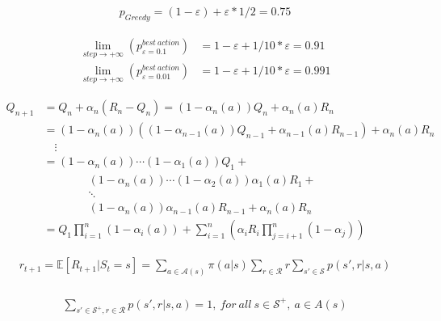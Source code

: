 \documentclass{article}
\begin{document}
\[
  \begin{aligned}
    p_{Greedy} = (1 - \varepsilon) + \varepsilon * 1/2 = 0.75
  \end{aligned}
\]

\[
  \begin{aligned}
    \lim\limits_{step\to+\infty} (p_{\varepsilon=0.1}^{best \ action}) &= 1 - \varepsilon + 1/10 * \varepsilon = 0.91 \\
    \lim\limits_{step\to+\infty} (p_{\varepsilon=0.01}^{best \ action}) &= 1 - \varepsilon + 1/10 * \varepsilon = 0.991
  \end{aligned}
\]

\[
  \begin{aligned}
    Q_{n+1} &= Q_{n} + \alpha_n (R_n - Q_n) = (1 - \alpha_n(a))Q_n + \alpha_n(a)R_n \\
            &= (1 - \alpha_n(a))((1 - \alpha_{n-1}(a))Q_{n-1} + \alpha_{n-1}(a)R_{n-1}) + \alpha_n(a)R_n\\
            & \quad \vdots\\
            &= (1 - \alpha_n(a))\cdots(1-\alpha_1(a))Q_1 + \\
            & \qquad \qquad (1 - \alpha_n(a))\cdots(1-\alpha_2(a))\alpha_1(a)R_1 + \\
            & \qquad \qquad \ddots\\
            & \qquad \qquad (1 - \alpha_n(a))\alpha_{n-1}(a)R_{n-1} + \alpha_n(a)R_n \\
            &= Q_1\prod^n_{i=1}(1 - \alpha_i(a)) + \sum^n_{i=1} (\alpha_iR_i \prod^n_{j=i+1}(1-\alpha_j))
  \end{aligned}
\]

\[
  \begin{aligned}
  r_{t+1} = \mathbb{E}[R_{t+1} | S_t = s] = \sum_{a\in \mathcal{A}(s)}\pi(a|s) \sum_{r\in\mathcal{R}} r \sum_{s'\in\mathcal{S}}p(s',r|s,a)\\
  \end{aligned}
\]

\[
  \begin{aligned}
  \sum_{s' \in \mathcal{S^+},r \in \mathcal{R}} p(s',r|s,a) = 1, \ for \ all \ s \in \mathcal{S^+}, \ a \in A(s)
  \end{aligned}
\]
\end{document}
